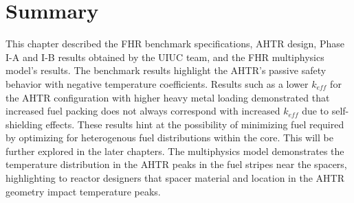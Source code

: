 \pagebreak
\section{Summary}
\glsresetall
This chapter described the \gls{FHR} benchmark specifications, \gls{AHTR} design,
Phase I-A and I-B results obtained by the \gls{UIUC} team, and the \gls{FHR} 
multiphysics model's results.  
The benchmark results highlight the \gls{AHTR}'s passive safety behavior with 
negative temperature coefficients. 
Results such as a lower $k_{eff}$ for the \gls{AHTR} configuration with 
higher heavy metal loading demonstrated that increased fuel packing does not always 
correspond with increased $k_{eff}$ due to self-shielding effects.
These results hint at the possibility of minimizing fuel required by optimizing 
for heterogenous fuel distributions within the core. 
This will be further explored in the later chapters. 
The multiphysics model demonstrates the temperature distribution in the \gls{AHTR} 
peaks in the fuel stripes near the spacers, highlighting to reactor designers that 
spacer material and location in the \gls{AHTR} geometry impact temperature peaks. 
